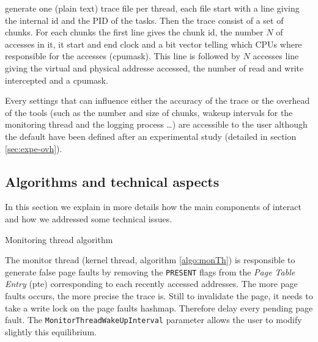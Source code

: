 \Moca generate one (plain text) trace file per thread, each file start with a
line giving the internal id and the PID of the tasks. Then the trace consist
of a set of chunks. For each chunks the first line gives the chunk id, the
number $N$ of accesses in it, it start and end clock and a bit vector telling
which CPUs where responsible for the accesses (cpumask). This line is followed
by $N$ accesses line giving the virtual and physical addresse accessed, the
number of read and write intercepted and a cpumask.

Every settings that can influence either the accuracy of the trace or the
overhead of the tools (such as the number and size of chunks, wakeup intervals
for the monitoring thread and the logging process \ldots) are accessible to the
user although the default have been defined after an experimental study
(detailed in section \ref{sec:expe-ovh}).

\subsection{Algorithms and technical aspects}
\label{sec:design-tech}

In this section we explain in more details how the main components of \Moca
interact and how we addressed some technical issues.

\begin{algorithm}[htb]
    \caption{Monitoring thread algorithm}
    \label{algo:monTh}
    \begin{algorithmic}[1]
        \State {}
                    \State {}
                    \State {}
                    \State {}
                \EndFor
            \EndFor
            \State {}
        \EndWhile
    \end{algorithmic}
\end{algorithm}

The monitor thread (kernel thread, algorithm \ref{algo:monTh}) is
responsible to generate false page faults by removing the \texttt{PRESENT}
flags from the \emph{Page Table Entry} (pte) corresponding to each recently
accessed addresses. The more page faults occurs, the more
precise the trace is. Still to invalidate the page, it needs
to take a write lock on the page faults hashmap. Therefore
delay every pending page fault. The
\texttt{MonitorThreadWakeUpInterval} parameter allows the user
to modify slightly this equilibrium.

